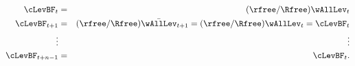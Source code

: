 \begin{eqnarray*}
          \cLevBF_{t  } & = & (\rfree/\Rfree)\wAllLev_{t} \label{eq:ct}
  \\      \cLevBF_{t+1} & = & (\rfree/\Rfree)\bar{\wAllLev}_{t+1} = (\rfree/\Rfree)     \wAllLev _{t} = \cLevBF_{t}
  \\               \vdots  &  & \vdots \nonumber
  \\        \cLevBF_{t+n-1} & = & \cLevBF_{t}
\label{eq:ctpn}.
\end{eqnarray*}
